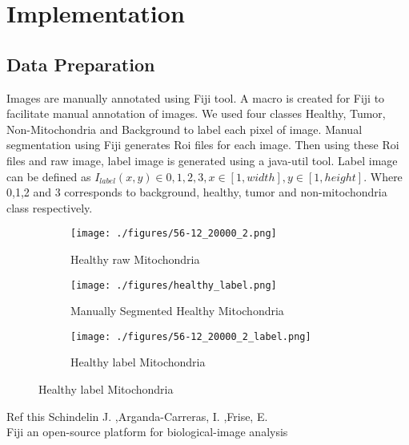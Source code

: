 	
	\chapter{Implementation}\label{chapter:04_implementation}
	
	\section{Data Preparation}
Images are manually annotated using Fiji tool. A macro is created for Fiji to facilitate manual annotation of images. We used four classes Healthy, Tumor, Non-Mitochondria and Background to label each pixel of image. Manual segmentation using Fiji generates Roi files for each image. Then using these Roi files and raw image, label image is generated using a java-util tool. Label image can be defined as $ I_{label}(x,y) \in {0,1,2,3}, x \in [1,width], y \in [1,height]$. Where 0,1,2 and 3 corresponds to background, healthy, tumor and non-mitochondria class respectively.
\begin{figure}[h!]
\begin{subfigure}{.3\textwidth}
        \centering
        \texttt{[image: ./figures/56-12\_20000\_2.png]}
        
        \caption{Healthy raw Mitochondria}
    \end{subfigure}
\begin{subfigure}{.3\textwidth}
        \centering
        \texttt{[image: ./figures/healthy\_label.png]}
      \caption{Manually Segmented Healthy  Mitochondria}
    \end{subfigure}
    \begin{subfigure}{.3\textwidth}
        \centering
      \texttt{[image: ./figures/56-12\_20000\_2\_label.png]}
       \caption{Healthy label Mitochondria}
    \end{subfigure}
 \end{figure}
\begin{center}
\tiny{ Ref this Schindelin J. ,Arganda-Carreras, I. ,Frise, E. \\
	Fiji an open-source platform for biological-image analysis 
}
\end{center}

